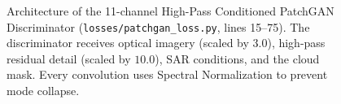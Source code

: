 \begin{figure}[htbp]
\caption{Architecture of the 11-channel High-Pass Conditioned PatchGAN Discriminator (\texttt{losses/patchgan\_loss.py}, lines 15--75). The discriminator receives optical imagery (scaled by $3.0$), high-pass residual detail (scaled by $10.0$), SAR conditions, and the cloud mask. Every convolution uses Spectral Normalization to prevent mode collapse.}
\label{fig:patchgan_11ch}
\end{figure}
